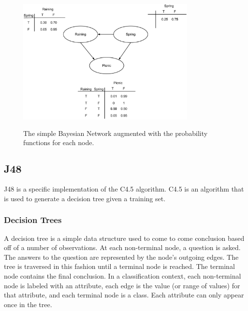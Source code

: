 \documentclass[12pt]{ucthesis}
\newcommand{\captionfonts}{\small\bf\ssp}
\begin{document}
\begin{figure}
   \begin{center}
      \includegraphics[width=0.8\textwidth]{images/Bayes_Net_2.eps}
      \captionfonts
      \caption[Bayes Net With Probabilities]{The simple Bayesian Network augmented with the probability functions for each node.}
      \label{fig:bayesNet2}
   \end{center}
\end{figure}

\subsection{J48}
\label{background-classifiers-j48}
J48 is a specific implementation of the C4.5 algorithm.
C4.5 is an algorithm that is used to generate a decision tree given a training set.

\subsubsection{Decision Trees}
\label{background-classifiers-j48-decision-trees}
A decision tree is a simple data structure used to come to come conclusion based off of a number of observations.
At each non-terminal node, a question is asked. The answers to the question are represented by the node's outgoing edges.
The tree is traversed in this fashion until a terminal node is reached. The terminal node contains the final conclusion.
In a classification context, each non-terminal node is labeled with an attribute, each edge is the value (or range of values)
for that attribute, and each terminal node is a class. Each attribute can only appear once in the tree.
\end{document}
